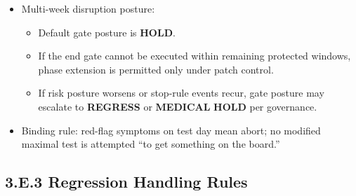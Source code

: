 \documentclass[10pt]{article}
\begin{document}
\begin{itemize}
\item Multi-week disruption posture:
\begin{itemize}
\item Default gate posture is \textbf{HOLD}.
\item If the end gate cannot be executed within remaining protected windows, phase extension is permitted only under patch control.
\item If risk posture worsens or stop-rule events recur, gate posture may escalate to \textbf{REGRESS} or \textbf{MEDICAL} \textbf{HOLD} per governance.
\end{itemize}

\item Binding rule: red-flag symptoms on test day mean abort; no modified maximal test is attempted “to get something on the board.”
\end{itemize}

\subsection*{3.E.3 Regression Handling Rules}
{}
\end{document}
